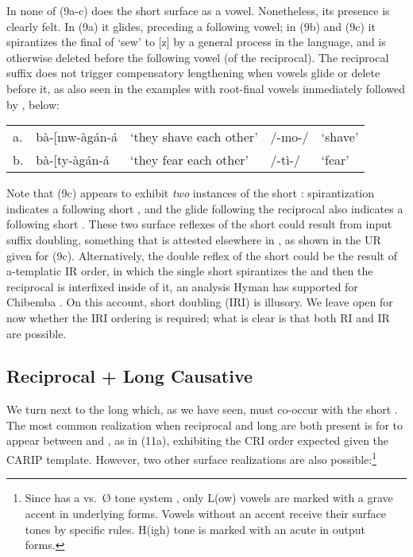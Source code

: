 \documentclass[output=paper,
modfonts
]{LSP/langsci}
\begin{document}
\noindent In none of (9a-c) does the short   surface as a
vowel. Nonetheless, its presence is clearly felt. In (9a) it glides,
preceding a following vowel; in (9b) and (9c) it spirantizes the final
 of  `sew' to {[}z{]} by a general process in the language,
and is otherwise deleted before the following vowel (of the reciprocal).
The reciprocal suffix  does not trigger compensatory
lengthening when vowels glide or delete before it, as also seen in the
examples with root-final vowels immediately followed by ,
below:

\ea \label{ex:hyman:10}\begin{tabular}[t]{@{}lllll}
a. & bà-{[}mw-àgán-á & `they shave each other' & /-mo-/ & `shave'\\
b. & bà-{[}ty-àgán-á & `they fear each other' & /-tì-/ & `fear'
\end{tabular}
\z

\noindent Note that (9c) appears to exhibit \emph{two} instances of the short
:  spirantization indicates a following short ,
and the glide following the reciprocal also indicates a following short
. These two surface reflexes of the short  could
result from input suffix doubling, something that is attested elsewhere
in , as shown in the UR given for (9c). Alternatively, the double
reflex of the short  could be the result of a-templatic IR
order, in which the single short  spirantizes the  and then
the reciprocal is interfixed inside of it, an analysis Hyman has
supported for Chibemba . On this account, short  doubling
(IRI) is illusory. We leave open for now whether the IRI ordering is
required; what is clear is that both RI and IR are possible.

\subsection{Reciprocal + Long Causative}

We turn next to the long   which, as we have seen,
must co-occur with the short  . The most common
realization when reciprocal and long  are both present is for
 to appear between  and , as in (11a),
exhibiting the CRI order expected given the CARIP template. However, two
other surface realizations are also possible:\footnote{Since  has
  a  vs.\ Ø tone system \citep{hyman2016}, only L(ow) vowels are marked
  with a grave accent in underlying forms. Vowels without an accent
  receive their surface tones by specific rules. H(igh) tone is marked
  with an acute in output forms.}
\end{document}
